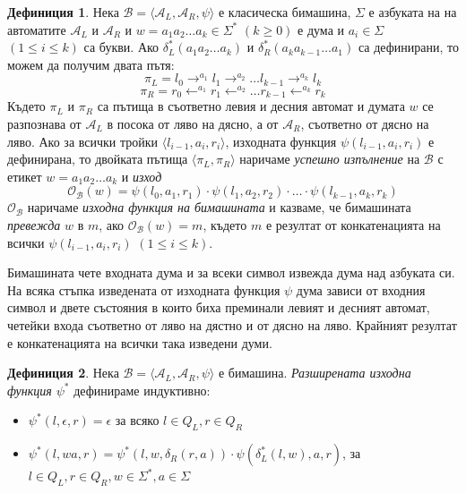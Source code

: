 \documentclass[12pt, oneside]{article}
\theoremstyle{definition}
\newtheorem{definition}{Дефиниция}[section]
\begin{document}
\begin{definition} 
	Нека \( \mathcal{B} = \langle \mathcal{A}_L, \mathcal{A}_R, \psi \rangle \) е класическа бимашина, \( \Sigma \) е азбуката на на автоматите \( \mathcal{A}_L \) и \( \mathcal{A}_R \) и \( w = a_1a_2 \dots a_k \in \Sigma^* \) \( (k \geq 0) \) е дума и \( a_i \in \Sigma \) \( (1 \leq i \leq k) \) са букви. Ако \( \delta_L^*(a_1a_2 \ldots a_k) \) и \( \delta_R^*(a_ka_{k-1} \dots a_1) \) са дефинирани, то можем да получим двата пътя:
	\[ \pi_L = l_0 \to^{a_1} l_1 \to^{a_2} \ldots l_{k-1} \to^{a_k} l_k \]
	\[ \pi_R = r_0 \leftarrow^{a_1} r_1 \leftarrow^{a_2} \ldots r_{k-1} \leftarrow^{a_k} r_k \]
	Където \( \pi_L \) и \( \pi_R \) са пътища в съответно левия и десния автомат и думата \( w \) се разпознава от \( \mathcal{A}_L \) в посока от ляво на дясно, а от \( \mathcal{A}_R \), съответно от дясно на ляво. Ако за всички тройки \( \langle l_{i-1}, a_i, r_i \rangle \), изходната функция \( \psi(l_{i-1}, a_i, r_i) \) е дефинирана, то двойката пътища \( \langle \pi_L, \pi_R \rangle \) наричаме \emph{успешно изпълнение} на \( \mathcal{B} \) с етикет \( w = a_1a_2 \dots a_k \) и \emph{изход}
	\[ \mathcal{O_B}(w) = \psi(l_0, a_1, r_1) \cdot \psi(l_1, a_2, r_2) \cdot \dots \cdot \psi(l_{k-1}, a_k, r_k) \]
	\( \mathcal{O_B} \) наричаме \emph{изходна функция на бимашината} и казваме, че бимашината \emph{превежда} \(w\) в \(m\), ако \( \mathcal{O_B}(w) = m \), където \(m\) е резултат от конкатенацията на всички \( \psi(l_{i-1}, a_i, r_i) \) \( (1 \leq i \leq k) \).
\end{definition}

\noindent Бимашината чете входната дума и за всеки символ извежда дума над азбуката си. На всяка стъпка изведената от изходната функция \( \psi \) дума зависи от входния символ и двете състояния в които биха преминали левият и десният автомат, четейки входа съответно от ляво на дястно и от дясно на ляво. Крайният резултат е конкатенацията на всички така изведени думи.

\begin{definition}
	Нека \( \mathcal{B} = \langle \mathcal{A}_L, \mathcal{A}_R, \psi \rangle \) е бимашина. \emph{Разширената изходна функция \( \psi^* \)} дефинираме индуктивно:

	\begin{itemize}
		\item \( \psi^*(l, \epsilon, r) = \epsilon \) за всяко \( l \in Q_L, r \in Q_R \)
		\item \( \psi^*(l, wa, r) = \psi^*(l, w, \delta_R(r, a)) \cdot \psi(\delta^*_L(l, w), a, r) \), за \( l \in Q_L, r \in Q_R, w \in \Sigma^*, a \in \Sigma \)
	\end{itemize}
\end{definition}
\end{document}
